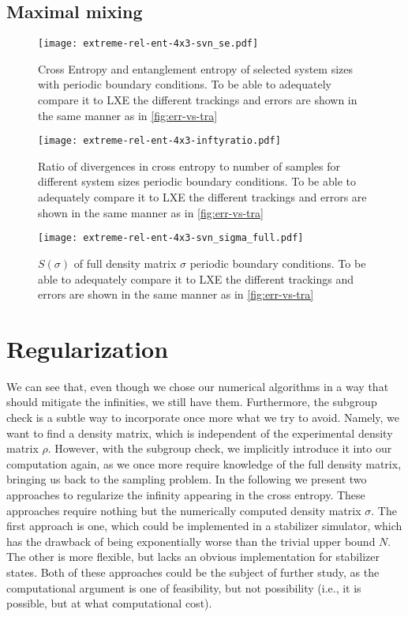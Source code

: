\subsection{Maximal mixing}
\begin{figure}[H]
  \centering
  \texttt{[image: extreme-rel-ent-4x3-svn\_se.pdf]}
  \caption{Cross Entropy and entanglement entropy of selected system sizes with
  periodic boundary conditions. To be able to adequately compare it to LXE the
different trackings and errors are shown in the same manner as in
\cref{fig:err-vs-tra}}
  \label{fig:max_mix-svn_se-4x3}
\end{figure}
\begin{figure}[H]
  \centering
  \texttt{[image: extreme-rel-ent-4x3-inftyratio.pdf]}
  \caption{Ratio of divergences in cross entropy to number of samples for
    different system sizes
  periodic boundary conditions. To be able to adequately compare it to LXE the
different trackings and errors are shown in the same manner as in
\cref{fig:err-vs-tra}}
  \label{fig:max_mix-inftyratio-4x3}
\end{figure}
\begin{figure}[H]
  \centering
  \texttt{[image: extreme-rel-ent-4x3-svn\_sigma\_full.pdf]}
  \caption{$S(\sigma)$ of full density matrix $\sigma$ 
  periodic boundary conditions. To be able to adequately compare it to LXE the
different trackings and errors are shown in the same manner as in
\cref{fig:err-vs-tra}}
  \label{fig:max_mix-svn_sigma_full-4x3}
\end{figure}

\section{Regularization}
We can see that, even though we chose our numerical algorithms in a way that
should mitigate the infinities, we still have them. Furthermore, the subgroup
check is a subtle way to incorporate once more what we try to avoid. Namely,
we want to find a density matrix, which is independent of the experimental
density matrix $\rho$. However, with the subgroup check, we implicitly
introduce it into our computation again, as we once more require knowledge of
the full density matrix, bringing us back to the sampling problem. In the
following we present two approaches to regularize the infinity appearing in the
cross entropy. These approaches require nothing but the numerically computed
density matrix $\sigma$. The first approach is one, which could be implemented
in a stabilizer simulator, which has the drawback of being exponentially worse
than the trivial upper bound $N$. The other is more flexible, but lacks an
obvious implementation for stabilizer states. Both of these approaches could be
the subject of further study, as the computational argument is one of
feasibility, but not possibility (i.e., it is possible, but at what
computational cost).
